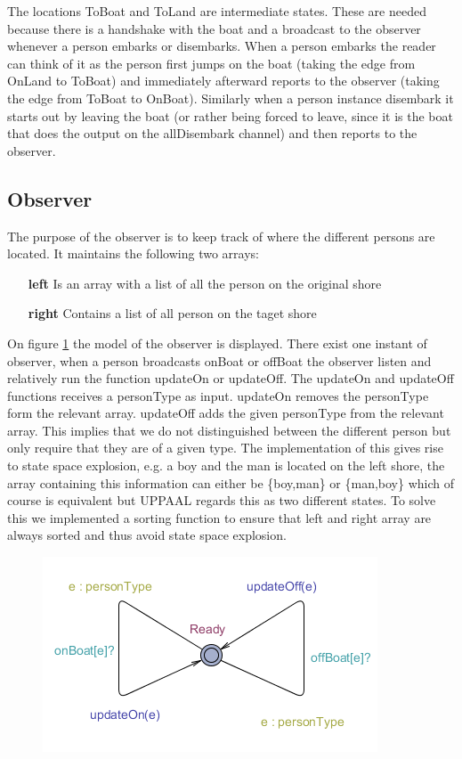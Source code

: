 The locations ToBoat and ToLand are intermediate states.
These are needed because there is a handshake with the boat and a broadcast to the observer whenever a person embarks or disembarks.
When a person embarks the reader can think of it as the person first jumps on the boat (taking the edge from OnLand to ToBoat) and immediately afterward reports to the observer (taking the edge from ToBoat to OnBoat).
Similarly when a person instance disembark it starts out by leaving the boat (or rather being forced to leave, since it is the boat that does the output on the allDisembark channel) and then reports to the observer.
















\subsection{Observer}
The purpose of the observer is to keep track of where the different persons are located. It maintains the following two arrays:
\begin{itemize}
	\item[\textbf{left}] Is an array with a list of all the person on the original shore
	\item[\textbf{right}] Contains a list of all person on the taget shore
\end{itemize}

On figure \ref{fig:observer} the model of the observer is displayed. There exist one instant of observer, when a person broadcasts onBoat or offBoat the observer listen and relatively run the function updateOn or updateOff. 
The updateOn and updateOff functions receives a personType as input. updateOn removes the personType form the relevant array. updateOff adds the given personType from the relevant array. This implies that we do not distinguished between the different person but only require that they are of a given type. The implementation of this gives rise to state space explosion, e.g. a boy and the man is located on the left shore, the array containing this information can either be \{boy,man\} or \{man,boy\} which of course is equivalent but UPPAAL regards this as two different states. To solve this we implemented a sorting function to ensure that left and right array are always sorted and thus avoid state space explosion.

\begin{figure}%
\includegraphics[width=\columnwidth]{pictures/observer.png}%
\caption{}%
\label{fig:observer}%
\end{figure}



